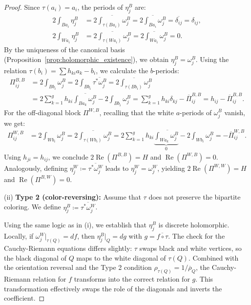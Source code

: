 \documentclass[10pt,a4paper]{amsart}
\renewcommand{\Re}{\operatorname{Re}}
\begin{document}
\begin{proof}
	Since $\tau(a_i)=a_i$, the periods of $\eta_j^B$ are:
	\begin{align*}
		2\int_{Ba_i} \eta_j^B &= \overline{2\int_{\tau(Ba_i)} \omega_j^B} = \overline{2\int_{Ba_i} \omega_j^B} = \overline{\delta_{ij}} = \delta_{ij}, \\
		2\int_{Wa_i} \eta_j^B &= \overline{2\int_{\tau(Wa_i)} \omega_j^B} = \overline{2\int_{Wa_i} \omega_j^B} = 0.
	\end{align*}
	By the uniqueness of the canonical basis (Proposition~\ref{prop:holomorphic_existence}), we obtain $\eta_j^B = \omega_j^B$.
	Using the relation $\tau(b_i) = \sum h_{ki} a_k - b_i$, we calculate the $b$-periods:
	\begin{align*}
		\Pi_{ij}^{B,B} &= 2 \int_{Bb_i} \omega_j^B = 2 \int_{Bb_i} \overline{\tau^*\omega_j^B} = \overline{2 \int_{\tau(Bb_i)} \omega_j^B} \\
		&= \overline{2 \sum_{k=1}^{g} h_{ki} \int_{Ba_k} \omega_j^B - 2 \int_{Bb_i} \omega_j^B}
		= \sum_{k=1}^g h_{ki} \delta_{kj} - \overline{\Pi}_{ij}^{B,B} = h_{ij} - \overline{\Pi}_{ij}^{B,B}.
	\end{align*}
	For the off-diagonal block $\Pi^{W,B}$, recalling that the white $a$-periods of $\omega_j^B$ vanish, we get:
	\begin{align*}
		\Pi_{ij}^{W,B} &= 2 \int_{Wb_i} \omega_j^B = \overline{2 \int_{\tau(Wb_i)} \omega_j^B}
		= \overline{2 \sum_{k=1}^{g} h_{ki} \underbrace{\int_{Wa_k} \omega_j^B}_{0} - 2 \int_{Wb_i} \omega_j^B}
		= - \overline{\Pi}_{ij}^{W,B}.
	\end{align*}
	Using $h_{ji}=h_{ij}$, we conclude $2 \Re(\Pi^{B,B}) = H$ and $\Re(\Pi^{W,B}) = 0$.
	Analogously, defining $\eta_j^W \coloneqq \overline{\tau^*\omega_j^W}$ leads to $\eta_j^W = \omega_j^W$, yielding $2 \Re(\Pi^{W,W}) = H$ and $\Re(\Pi^{B,W}) = 0$.
	
	(ii) \textbf{Type 2 (color-reversing):} Assume that $\tau$ does not preserve the bipartite coloring. We define $\eta_j^B \coloneqq \overline{\tau^*\omega_j^W}$.
	
	Using the same logic as in (i), we establish that $\eta_j^B$ is discrete holomorphic. Locally, if $\omega_j^W|_{\tau(Q)} = df$, then $\eta_j^B|_Q = dg$ with $g = \overline{f \circ \tau}$. The check for the Cauchy-Riemann equations differs slightly: $\tau$ swaps black and white vertices, so the black diagonal of $Q$ maps to the white diagonal of $\tau(Q)$. Combined with the orientation reversal and the Type 2 condition $\rho_{\tau(Q)} = 1/\overline{\rho}_Q$, the Cauchy-Riemann relation for $f$ transforms into the correct relation for $g$. This transformation effectively swaps the role of the diagonals and inverts the coefficient.
	

\end{proof}
\end{document}
